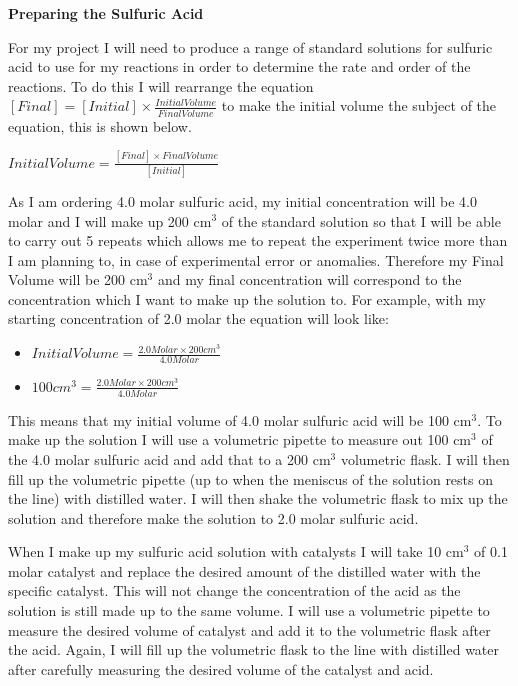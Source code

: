 \textbf{Preparing the Sulfuric Acid}

For my project I will need to produce a range of standard solutions for sulfuric acid to use for my reactions in order to determine the rate and order of the reactions. To do this I will rearrange the equation $[Final] = [Initial] \times \frac{Initial Volume}{Final Volume}$ to make the initial volume the subject of the equation, this is shown below.

$Initial Volume = \frac{[Final] \times Final Volume}{[Initial]}$

As I am ordering 4.0 molar sulfuric acid, my initial concentration will be 4.0 molar and I will make up 200 cm$^3$ of the standard solution so that I will be able to carry out 5 repeats which allows me to repeat the experiment twice more than I am planning to, in case of experimental error or anomalies. Therefore my Final Volume will be 200 cm$^3$ and my final concentration will correspond to the concentration which I want to make up the solution to. For example, with my starting concentration of 2.0 molar the equation will look like:

\begin{itemize}
\item $Initial Volume = \frac{2.0 Molar \times 200 cm^3}{4.0 Molar}$
\item $100 cm^3 = \frac{2.0 Molar \times 200 cm^3}{4.0 Molar}$
\end{itemize}

This means that my initial volume of 4.0 molar sulfuric acid will be 100 cm$^3$. To make up the solution I will use a volumetric pipette to measure out 100 cm$^3$ of the 4.0 molar sulfuric acid and add that to a 200 cm$^3$ volumetric flask. I will then fill up the volumetric pipette (up to when the meniscus of the solution rests on the line) with distilled water. I will then shake the volumetric flask to mix up the solution and therefore make the solution to 2.0 molar sulfuric acid. 

When I make up my sulfuric acid solution with catalysts I will take 10 cm$^3$ of 0.1 molar catalyst and replace the desired amount of the distilled water with the specific catalyst. This will not change the concentration of the acid as the solution is still made up to the same volume. I will use a volumetric pipette to measure the desired volume of catalyst and add it to the volumetric flask after the acid. Again, I will fill up the volumetric flask to the line with distilled water after carefully measuring the desired volume of the catalyst and acid.










